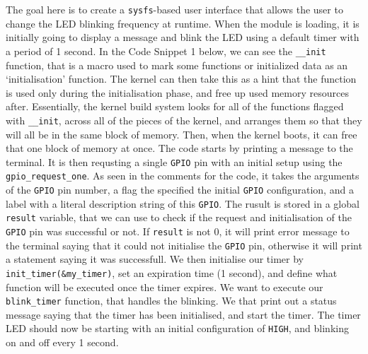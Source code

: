 \documentclass[a4paper,oneside,onecolumn]{article}
\newcommand{\code}[1]{\colorbox{codegray}{\texttt{#1}}}
\begin{document}
\noindent
The goal here is to create a \texttt{sysfs}-based user interface that allows the user to change the LED blinking frequency at runtime. When the module is loading, it is initially going to display a message and blink the LED using a default timer with a period of 1 second.
\newline
In the Code Snippet 1 below, we can see the \code{\_\_init} function, that is a macro used to mark some functions or initialized data as an `initialisation' function. The kernel can then take this as a hint that the function is used only during the initialisation phase, and free up used memory resources after. Essentially, the kernel build system looks for all of the functions flagged with \code{\_\_init}, across all of the pieces of the kernel, and arranges them so that they will all be in the same block of memory. Then, when the kernel boots, it can free that one block of memory at once.
\newline
\newline
The code starts by printing a message to the terminal. It is then requsting a single \texttt{GPIO} pin with an initial setup using the \code{gpio\_request\_one}. As seen in the comments for the code, it takes the arguments of the \texttt{GPIO} pin number, a flag the specified the initial \texttt{GPIO} configuration, and a label with a literal description string of this \texttt{GPIO}. The rusult is stored in a global \code{result} variable, that we can use to check if the request and initialisation of the \texttt{GPIO} pin was successful or not. If \code{result} is not 0, it will print error message to the terminal saying that it could not initialise the \texttt{GPIO} pin, otherwise it will print a statement saying it was successfull.
\newline
We then initialise our timer by \code{init\_timer(\&my\_timer)}, set an expiration time (1 second), and define what function will be executed once the timer expires. We want to execute our \code{blink\_timer} function, that handles the blinking. We that print out a status message saying that the timer has been initialised, and start the timer.
\newline
The timer LED should now be starting with an initial configuration of \texttt{HIGH}, and blinking on and off every 1 second.
\end{document}
